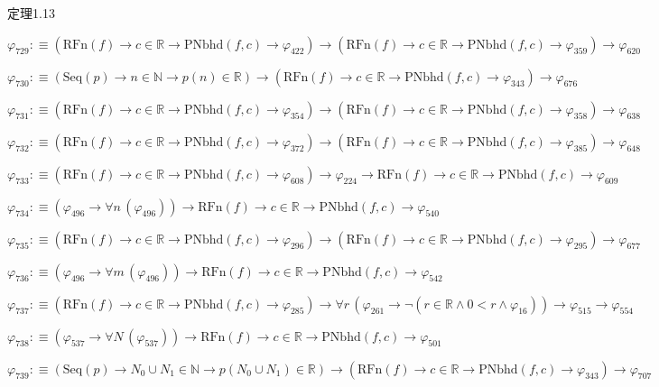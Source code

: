 \begin{fullproof}{定理1.13}
\begin{abbrevlist}
\item $\varphi_{729} :\equiv (\mathrm{RFn}(f) \to c \in \mathbb{R} \to \mathrm{PNbhd}(f,c) \to \varphi_{422}) \to (\mathrm{RFn}(f) \to c \in \mathbb{R} \to \mathrm{PNbhd}(f,c) \to \varphi_{359}) \to \varphi_{620}$
\item $\varphi_{730} :\equiv (\mathrm{Seq}(p) \to n \in \mathbb{N} \to p(n) \in \mathbb{R}) \to (\mathrm{RFn}(f) \to c \in \mathbb{R} \to \mathrm{PNbhd}(f,c) \to \varphi_{343}) \to \varphi_{676}$
\item $\varphi_{731} :\equiv (\mathrm{RFn}(f) \to c \in \mathbb{R} \to \mathrm{PNbhd}(f,c) \to \varphi_{354}) \to (\mathrm{RFn}(f) \to c \in \mathbb{R} \to \mathrm{PNbhd}(f,c) \to \varphi_{358}) \to \varphi_{638}$
\item $\varphi_{732} :\equiv (\mathrm{RFn}(f) \to c \in \mathbb{R} \to \mathrm{PNbhd}(f,c) \to \varphi_{372}) \to (\mathrm{RFn}(f) \to c \in \mathbb{R} \to \mathrm{PNbhd}(f,c) \to \varphi_{385}) \to \varphi_{648}$
\item $\varphi_{733} :\equiv (\mathrm{RFn}(f) \to c \in \mathbb{R} \to \mathrm{PNbhd}(f,c) \to \varphi_{608}) \to \varphi_{224} \to \mathrm{RFn}(f) \to c \in \mathbb{R} \to \mathrm{PNbhd}(f,c) \to \varphi_{609}$
\item $\varphi_{734} :\equiv (\varphi_{496} \to \forall n\,(\varphi_{496})) \to \mathrm{RFn}(f) \to c \in \mathbb{R} \to \mathrm{PNbhd}(f,c) \to \varphi_{540}$
\item $\varphi_{735} :\equiv (\mathrm{RFn}(f) \to c \in \mathbb{R} \to \mathrm{PNbhd}(f,c) \to \varphi_{296}) \to (\mathrm{RFn}(f) \to c \in \mathbb{R} \to \mathrm{PNbhd}(f,c) \to \varphi_{295}) \to \varphi_{677}$
\item $\varphi_{736} :\equiv (\varphi_{496} \to \forall m\,(\varphi_{496})) \to \mathrm{RFn}(f) \to c \in \mathbb{R} \to \mathrm{PNbhd}(f,c) \to \varphi_{542}$
\item $\varphi_{737} :\equiv (\mathrm{RFn}(f) \to c \in \mathbb{R} \to \mathrm{PNbhd}(f,c) \to \varphi_{285}) \to \forall r\,(\varphi_{261} \to \neg (r \in \mathbb{R} \land 0 < r \land \varphi_{16})) \to \varphi_{515} \to \varphi_{554}$
\item $\varphi_{738} :\equiv (\varphi_{537} \to \forall N\,(\varphi_{537})) \to \mathrm{RFn}(f) \to c \in \mathbb{R} \to \mathrm{PNbhd}(f,c) \to \varphi_{501}$
\item $\varphi_{739} :\equiv (\mathrm{Seq}(p) \to N_{0} \cup N_{1} \in \mathbb{N} \to p(N_{0} \cup N_{1}) \in \mathbb{R}) \to (\mathrm{RFn}(f) \to c \in \mathbb{R} \to \mathrm{PNbhd}(f,c) \to \varphi_{343}) \to \varphi_{707}$

\end{abbrevlist}
\end{fullproof}
